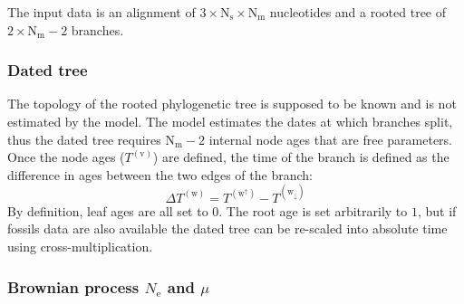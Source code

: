 \documentclass{article}
\newcommand{\e}{\mathrm{e}}
\newcommand{\Ne}{N_\e}
\newcommand{\taxon}{\text{m}}
\newcommand{\Ntaxa}{\text{N}_{\taxon}}
\newcommand{\branch}{\text{w}}
\newcommand{\branchexp}{^{(\branch)}}
\newcommand{\up}{\branch^{\uparrow}}
\newcommand{\down}{\branch_{\downarrow}}
\newcommand{\node}{\text{v}}
\newcommand{\age}{T}
\newcommand{\branchtime}{\Delta \age}
\newcommand{\site}{\text{s}}
\newcommand{\Nsite}{\text{N}_{\site}}
\begin{document}
The input data is an alignment of $ 3 \times \Nsite \times \Ntaxa $ nucleotides and a rooted tree of $2 \times \Ntaxa - 2 $ branches.

\subsubsection{Dated tree}

The topology of the rooted phylogenetic tree is supposed to be known and is not estimated by the model. 
The model estimates the dates at which branches split, thus the dated tree requires $\Ntaxa - 2$ internal node ages that are free parameters. 
Once the node ages ($\age^{(\node)}$) are defined, the time of the branch is defined as the difference in ages between the two edges of the branch:
\begin{equation}
\label{eq:ageTobranchtime}
\branchtime \branchexp =  \age^{(\up)} - \age^{(\down)} 
\end{equation}
By definition, leaf ages are all set to $0$. The root age is set arbitrarily to $1$, but if fossils data are also available the dated tree can be re-scaled into absolute time using cross-multiplication.

\subsubsection{Brownian process $\Ne$ and $\mu$}
\end{document}
